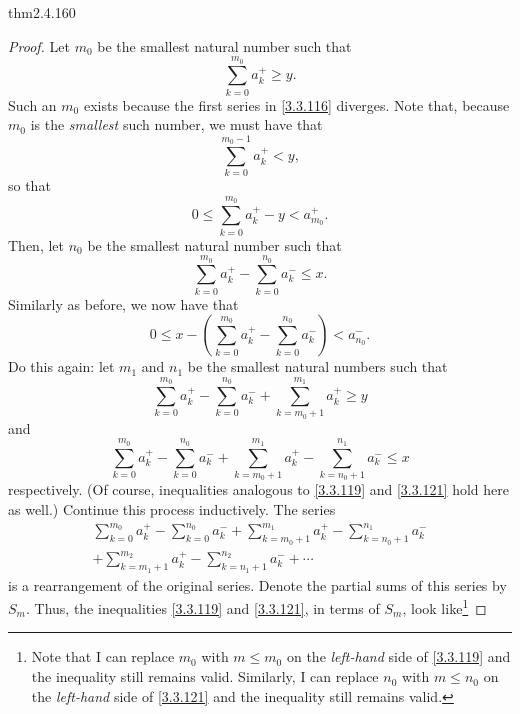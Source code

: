 \begin{thm}{}{thm2.4.160}
\begin{proof}
Let $m_0$ be the smallest natural number such that
\begin{equation}
\sum _{k=0}^{m_0}a_k^+\geq y.
\end{equation}
Such an $m_0$ exists because the first series in \eqref{3.3.116} diverges.  Note that, because $m_0$ is the \emph{smallest} such number, we must have that 
\begin{equation}
\sum _{k=0}^{m_0-1}a_k^+<y,
\end{equation}
so that
\begin{equation}\label{3.3.119}
0\leq \sum _{k=0}^{m_0}a_k^+-y<a_{m_0}^+.
\end{equation}
Then, let $n_0$ be the smallest natural number such that
\begin{equation}
\sum _{k=0}^{m_0}a_k^+-\sum _{k=0}^{n_0}a_k^-\leq x.
\end{equation}
Similarly as before, we now have that
\begin{equation}\label{3.3.121}
0\leq x-\left( \sum _{k=0}^{m_0}a_k^+-\sum _{k=0}^{n_0}a_k^-\right) <a_{n_0}^-.
\end{equation}
Do this again:  let $m_1$ and $n_1$ be the smallest natural numbers such that
\begin{equation}\label{3.3.130}
\sum _{k=0}^{m_0}a_k^+-\sum _{k=0}^{n_0}a_k^-+\sum _{k=m_0+1}^{m_1}a_k^+\geq y
\end{equation}
and
\begin{equation}\label{3.3.131}
\sum _{k=0}^{m_0}a_k^+-\sum _{k=0}^{n_0}a_k^-+\sum _{k=m_0+1}^{m_1}a_k^+-\sum _{k=n_0+1}^{n_1}a_k^-\leq x
\end{equation}
respectively.  (Of course, inequalities analogous to \eqref{3.3.119} and \eqref{3.3.121} hold here as well.)  Continue this process inductively.  The series
\begin{equation}
\begin{multlined}
\sum _{k=0}^{m_0}a_k^+-\sum _{k=0}^{n_0}a_k^-+\sum _{k=m_0+1}^{m_1}a_k^+-\sum _{k=n_0+1}^{n_1}a_k^- \\ +\sum _{k=m_1+1}^{m_2}a_k^+-\sum _{k=n_1+1}^{n_2}a_k^-+\cdots
\end{multlined}
\end{equation}
is a rearrangement of the original series.  Denote the partial sums of this series by $S_m$.  Thus, the inequalities \eqref{3.3.119} and \eqref{3.3.121}, in terms of $S_m$, look like\footnote{Note that I can replace $m_0$ with $m\leq m_0$ on the \emph{left-hand} side of \eqref{3.3.119} and the inequality still remains valid.  Similarly, I can replace $n_0$ with $m\leq n_0$ on the \emph{left-hand} side of \eqref{3.3.121} and the inequality still remains valid.}

\end{proof}
\end{thm}
